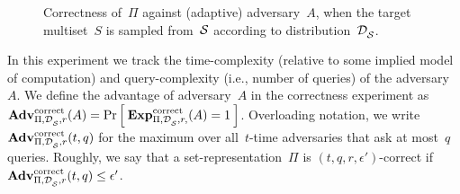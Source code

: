 \begin{figure}[htp]
\centering
{}
\caption{Correctness of~$\Pi$ against (adaptive) adversary~$A$, when
  the target multiset~$S$ is sampled from~${\cal S}$ according to distribution~$\mathcal{D}_{{\cal S}}^{}$.} 
\label{fig:correctness}
\end{figure}

In this experiment we track the time-complexity (relative to some
implied model of computation) and query-complexity (i.e., number of
queries) of the adversary~$A$.  
We define the advantage of adversary~$A$ in the correctness experiment as 
$\mathrm{\mathbf{Adv}}^{\mathrm{correct}}_{\Pi,\mathcal{D}_{{\cal S}}^{},r}(A) = \Pr\left[\: \mathrm{\mathbf{Exp}}^{\mathrm{correct}}_{\Pi,\mathcal{D}_{{\cal S}}^{}, r,}(A)=1 \:\right]$.
Overloading notation, we write $\mathrm{\mathbf{Adv}}^{\mathrm{correct}}_{\Pi,\mathcal{D}_{{\cal S}}^{},r}(t,q)$ for the maximum over all~$t$-time adversaries that ask at most~$q$ queries. Roughly, we say that a
set-representation~$\Pi$ is $(t,q,r,\epsilon')$-correct if $\mathrm{\mathbf{Adv}}^{\mathrm{correct}}_{\Pi,\mathcal{D}_{{\cal S}}^{},r}(t,q) \leq \epsilon'$.  

